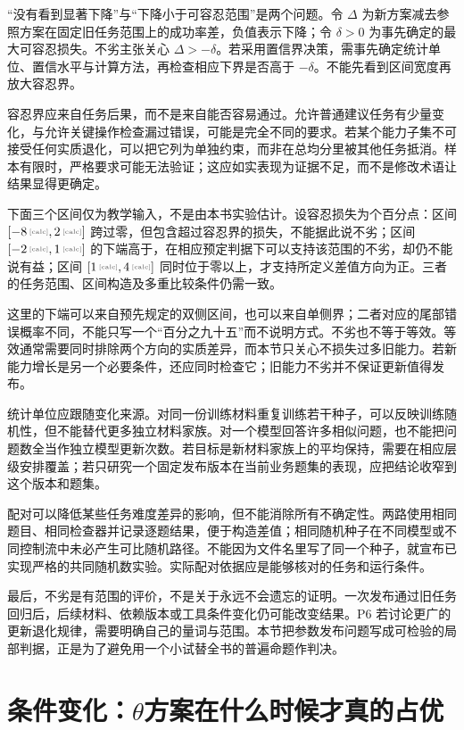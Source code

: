 “没有看到显著下降”与“下降小于可容忍范围”是两个问题。令 $\Delta$ 为新方案减去参照方案在固定旧任务范围上的成功率差，负值表示下降；令 $\delta>0$ 为事先确定的最大可容忍损失。不劣主张关心 $\Delta>-\delta$。若采用置信界决策，需事先确定统计单位、置信水平与计算方法，再检查相应下界是否高于 $-\delta$。不能先看到区间宽度再放大容忍界。

容忍界应来自任务后果，而不是来自能否容易通过。允许普通建议任务有少量变化，与允许关键操作检查漏过错误，可能是完全不同的要求。若某个能力子集不可接受任何实质退化，可以把它列为单独约束，而非在总均分里被其他任务抵消。样本有限时，严格要求可能无法验证；这应如实表现为证据不足，而不是修改术语让结果显得更确定。

下面三个区间仅为教学输入，不是由本书实验估计。设容忍损失为个百分点：区间 $[\calcnum{-8},\calcnum{2}]$ 跨过零，但包含超过容忍界的损失，不能据此说不劣；区间 $[\calcnum{-2},\calcnum{1}]$ 的下端高于，在相应预定判据下可以支持该范围的不劣，却仍不能说有益；区间 $[\calcnum{1},\calcnum{4}]$ 同时位于零以上，才支持所定义差值方向为正。三者的任务范围、区间构造及多重比较条件仍需一致。

这里的下端可以来自预先规定的双侧区间，也可以来自单侧界；二者对应的尾部错误概率不同，不能只写一个“百分之九十五”而不说明方式。不劣也不等于等效。等效通常需要同时排除两个方向的实质差异，而本节只关心不损失过多旧能力。若新能力增长是另一个必要条件，还应同时检查它；旧能力不劣并不保证更新值得发布。

统计单位应跟随变化来源。对同一份训练材料重复训练若干种子，可以反映训练随机性，但不能替代更多独立材料家族。对一个模型回答许多相似问题，也不能把问题数全当作独立模型更新次数。若目标是新材料家族上的平均保持，需要在相应层级安排覆盖；若只研究一个固定发布版本在当前业务题集的表现，应把结论收窄到这个版本和题集。

配对可以降低某些任务难度差异的影响，但不能消除所有不确定性。两路使用相同题目、相同检查器并记录逐题结果，便于构造差值；相同随机种子在不同模型或不同控制流中未必产生可比随机路径。不能因为文件名里写了同一个种子，就宣布已实现严格的共同随机数实验。实际配对依据应是能够核对的任务和运行条件。

最后，不劣是有范围的评价，不是关于永远不会遗忘的证明。一次发布通过旧任务回归后，后续材料、依赖版本或工具条件变化仍可能改变结果。P6 若讨论更广的更新退化规律，需要明确自己的量词与范围。本节把参数发布问题写成可检验的局部判据，正是为了避免用一个小试替全书的普遍命题作判决。

\section{条件变化：\texorpdfstring{$\theta$}{参数}方案在什么时候才真的占优}
\label{sec:ch10-conditions}

